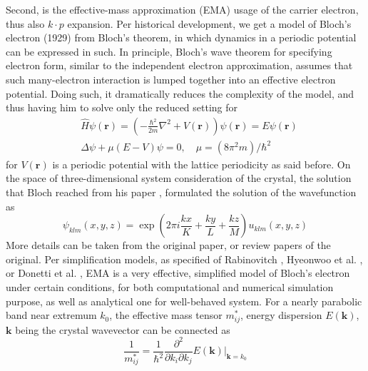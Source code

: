 Second, is the effective-mass approximation (EMA) usage of the carrier electron, thus also $k\cdot p$ expansion. Per historical development, we get a model of Bloch's electron (1929) from Bloch's theorem, in which dynamics in a periodic potential can be expressed in such. In principle, Bloch's wave theorem for specifying electron form, similar to the independent electron approximation, assumes that such many-electron interaction is lumped together into an effective electron potential. Doing such, it dramatically reduces the complexity of the model, and thus having him to solve only the reduced setting for
\begin{equation}
    \begin{split}
        &\hat{H}\psi(\mathbf{r}) = \left(-\frac{\hbar^2}{2m}\nabla^{2} + V(\mathbf{r})\right)\psi(\mathbf{r}) = E\psi(\mathbf{r})\\
        & \Delta \psi + \mu (E-V)\psi = 0, \quad \mu = (8\pi^{2}m)/\hbar^{2}
    \end{split}
\end{equation}
for $V(\mathbf{r})$ is a periodic potential with the lattice periodicity as said before. On the space of three-dimensional system consideration of the crystal, the solution that Bloch reached from his paper \cite{blochUberQuantenmechanikElektronen1929a}, formulated the solution of the wavefunction as
\begin{equation}
    \psi_{klm}(x,y,z) = \exp{\left( 2\pi i \dfrac{kx}{K}+\dfrac{ky}{L}+\dfrac{kz}{M} \right)}u_{klm}(x,y,z)
\end{equation}
More details can be taken from the original paper, or review papers of the original. Per simplification models, as specified of Rabinovitch \cite{PhysRevB.4.1017}, Hyeonwoo et al. \cite{Yeo_2020}, or Donetti et al. \cite{10.1063/1.3639281}, EMA is a very effective, simplified model of Bloch's electron under certain conditions, for both computational and numerical simulation purpose, as well as analytical one for well-behaved system. For a nearly parabolic band near extremum $k_{0}$, the effective mass tensor $m_{ij}^{*}$, energy dispersion $E(\mathbf{k})$, $\mathbf{k}$ being the crystal wavevector can be connected as
\begin{equation}
    \frac{1}{m_{ij}^{*}} = \frac{1}{\hbar^2} \frac{\partial^{2}}{\partial k_{i}\partial k_{j}}E(\mathbf{k}) \Bigg\rvert_{\mathbf{k}=k_{0}}
\end{equation}
